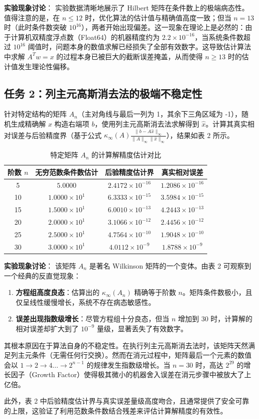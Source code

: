 \documentclass[a4paper,11pt]{article}
\begin{document}
\textbf{实验现象讨论}：
实验数据清晰地展示了 Hilbert 矩阵在条件数上的极端病态性。
值得注意的是，在 $n \le 12$ 时，优化算法的估计值与精确值高度一致；但当 $n = 13$ 时（此时条件数突破 $10^{16}$），两者开始出现偏差。这一现象在理论上是必然的：由于计算机双精度浮点数（Float64）的机器精度约为 $2.2 \times 10^{-16}$，当系统条件数超过 $10^{16}$ 阈值时，问题本身的数值求解已经损失了全部有效数字。这导致估计算法中求解 $A^T w = x$ 的过程本身已被巨大的截断误差掩盖，从而使得 $n \ge 13$ 时的估计值发生理论性偏移。

\subsection{任务 2：列主元高斯消去法的极端不稳定性}
针对特定结构的矩阵 $A_n$（主对角线与最后一列为 1，其余下三角区域为 -1），随机生成精确解 $x$ 构造右端项 $b$，使用列主元高斯消去法求解得到 $\hat{x}$。计算其真实相对误差与后验精度界（基于公式 $\kappa_\infty(A) \frac{\|b - A\hat{x}\|_\infty}{\|A\|_\infty \|\hat{x}\|_\infty}$），结果如表 2 所示。

\begin{table}[h]
\centering
\caption{特定矩阵 $A_n$ 的计算解精度估计对比}
\begin{tabular}{cccc}
\toprule
阶数 $n$ & 无穷范数条件数估计 & 后验精度估计界 & 真实相对误差 \\
\midrule
5  & $5.0000$ & $2.4172 \times 10^{-16}$ & $1.2086 \times 10^{-16}$ \\
10 & $1.0000 \times 10^{1}$ & $6.3333 \times 10^{-15}$ & $3.5984 \times 10^{-15}$ \\
15 & $1.5000 \times 10^{1}$ & $6.0010 \times 10^{-13}$ & $4.2443 \times 10^{-13}$ \\
20 & $2.0000 \times 10^{1}$ & $3.1066 \times 10^{-12}$ & $2.4456 \times 10^{-12}$ \\
25 & $2.5000 \times 10^{1}$ & $4.7564 \times 10^{-10}$  & $1.9048 \times 10^{-10}$  \\
30 & $3.0000 \times 10^{1}$ & $4.0112 \times 10^{-9}$  & $1.8788 \times 10^{-9}$  \\
\bottomrule
\end{tabular}
\end{table}

\textbf{实验现象讨论}：
该矩阵 $A_n$ 是著名 Wilkinson 矩阵的一个变体。由表 2 可观察到一个经典的反直觉现象：
\begin{enumerate}
    \item \textbf{方程组高度良态}：估算出的 $\kappa_\infty(A_n)$ 精确等于阶数 $n$。矩阵条件数极小，且仅呈线性缓慢增长，系统不存在病态敏感性。
    \item \textbf{误差出现指数级增长}：尽管方程组十分良态，但当 $n$ 增加到 30 时，计算解的相对误差却扩大到了 $10^{-9}$ 量级，显著丢失了有效数字。
\end{enumerate}

其根本原因在于算法自身的不稳定性。在执行列主元高斯消去法时，该矩阵天然满足列主元条件（无需任何行交换）。然而在消元过程中，矩阵最后一个元素的数值会以 $1 \to 2 \to 4 \dots \to 2^{n-1}$ 的规律发生指数级增长。当 $n=30$ 时，高达 $2^{29}$ 的增长因子（Growth Factor）使得极其微小的机器舍入误差在消元步骤中被放大了上亿倍。

此外，表 2 中后验精度估计界与真实误差量级高度吻合，且通常提供了安全可靠的上限，这验证了利用范数条件数结合残差来评估计算解精度的有效性。
\end{document}

